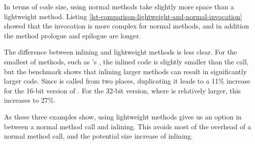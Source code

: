 In terms of code size, using normal methods take slightly more space than a lightweight method. Listing \ref{lst-comparison-lightweight-and-normal-invocation} showed that the invocation is more complex for normal methods, and in addition the method prologue and epilogue are longer.

The difference between inlining and lightweight methods is less clear. For the smallest of methods, such as 's , the inlined code is slightly smaller than the call, but the  benchmark shows that inlining larger methods can result in significantly larger code. Since  is called from two places, duplicating it leads to a 11\% increase for the 16-bit version of . For the 32-bit version, where  is relatively larger, this increases to 27\%.

As these three examples show, using lightweight methods gives us an option in between a normal method call and inlining. This avoids most of the overhead of a normal method call, and the potential size increase of inlining.


